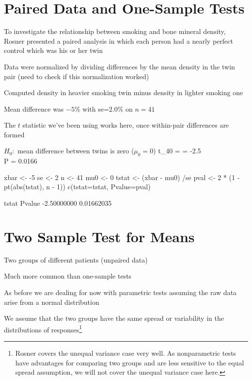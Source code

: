 \section{Paired Data and One-Sample Tests}  
\bi
\item To investigate the relationship between smoking and bone mineral
  density, Rosner presented a paired analysis in which each person had
  a nearly perfect control which was his or her twin
\item Data were normalized by dividing differences by the mean density
  in the twin pair (need to check if this normalization worked)
\item Computed density in heavier smoking twin minus density in
  lighter smoking one
\item Mean difference was $-5\%$ with se=$2.0\%$ on $n=41$
\item The $t$ statistic we've been using works here, once within-pair
  differences are formed
\item $H_{0}:$ mean difference between twins is zero ($\mu_{0} = 0$)
\beqa
t_{40} =  = -2.5 \\
P = 0.0166
\eeqa
\ei
\begin{Schunk}
\begin{Sinput}
xbar  <- -5
se    <- 2
n     <- 41
mu0   <- 0
tstat <- (xbar - mu0) /se
pval  <- 2 * (1 - pt(abs(tstat), n - 1))
c(tstat=tstat, Pvalue=pval)
\end{Sinput}
\begin{Soutput}
      tstat      Pvalue 
-2.50000000  0.01662035 
\end{Soutput}
\end{Schunk}

\section{Two Sample Test for Means} 
\bi
\item Two groups of different patients (unpaired data)
\item Much more common than one-sample tests
\item As before we are dealing for now with parametric tests assuming
  the raw data arise from a normal distribution
\item We assume that the two groups have the same
  spread or variability in the distributions of
  responses\footnote{Rosner covers the unequal variance case very
    well.  As nonparametric tests have advantages for comparing two
    groups and are less sensitive to the equal spread assumption, we
    will not cover the unequal variance case here.}
\ei

